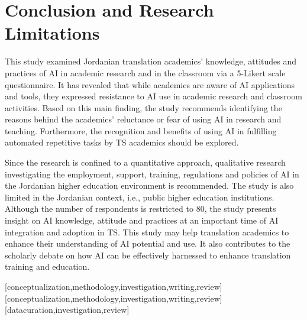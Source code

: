 \documentclass[english]{textolivre}
\begin{document}
\section{Conclusion and Research Limitations}
This study examined Jordanian translation academics’ knowledge, attitudes and practices of AI in academic research and in the classroom via a 5-Likert scale questionnaire. It has revealed that while academics are aware of AI applications and tools, they expressed resistance to AI use in academic research and classroom activities. Based on this main finding, the study recommends identifying the reasons behind the academics’ reluctance or fear of using AI in research and teaching. Furthermore, the recognition and benefits of using AI in fulfilling automated repetitive tasks by TS academics should be explored. 

Since the research is confined to a quantitative approach, qualitative research investigating the employment, support, training, regulations and policies of AI in the Jordanian higher education environment is recommended. The study is also limited in the Jordanian context, i.e., public higher education institutions. Although the number of respondents is restricted to 80, the study presents insight on AI knowledge, attitude and practices at an important time of AI integration and adoption in TS. This study may help translation academics to enhance their understanding of AI potential and use. It also contributes to the scholarly debate on how AI can be effectively harnessed to enhance translation training and education.


\printbibliography\label{sec-bib}

\begin{contributors}
[conceptualization,methodology,investigation,writing,review]
[conceptualization,methodology,investigation,writing,review]
[datacuration,investigation,review]
\end{contributors}
\end{document}
